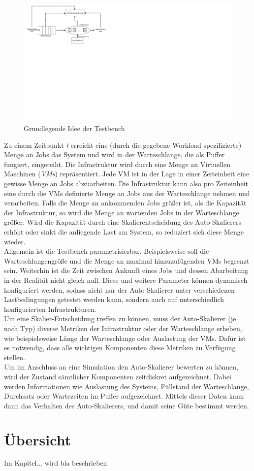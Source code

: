 \begin{figure}[!h]
	\includegraphics[width=\textwidth, trim={1cm 13cm 20cm 0cm}]{img/BasicIdea.pdf}
	\caption{Grundlegende Idee der Testbench}
	\label{fig:BasicIdea}
\end{figure}

\noindent
Zu einem Zeitpunkt \textit{t} erreicht eine (durch die gegebene Workload spezifizierte) Menge an Jobs das System und wird in der Warteschlange, die als Puffer fungiert, eingereiht. Die Infrastruktur wird durch eine Menge an Virtuellen Maschinen (\textit{VMs}) repräsentiert. Jede VM ist in der Lage in einer Zeiteinheit eine gewisse Menge an Jobs abzuarbeiten. Die Infrastruktur kann also pro Zeiteinheit eine durch die VMs definierte Menge an Jobs aus der Warteschlange nehmen und verarbeiten. Falls die Menge an ankommenden Jobs größer ist, als die Kapazität der Infrastruktur, so wird die Menge an wartenden Jobs in der Warteschlange größer. Wird die Kapazität durch eine Skalierentscheidung des Auto-Skalierers erhöht oder sinkt die anliegende Last am System, so reduziert sich diese Menge wieder. \\
Allgemein ist die Testbench parametrisierbar. Beispielsweise soll die Warteschlangengröße und die Menge an maximal hinzuzufügenden VMs begrenzt sein. Weiterhin ist die Zeit zwischen Ankunft eines Jobs und dessen Abarbeitung in der Realität nicht gleich null. Diese und weitere Parameter können dynamisch konfiguriert werden, sodass nicht nur der Auto-Skalierer unter verschiedenen Lastbedingungen getestet werden kann, sondern auch auf unterschiedlich konfigurierten Infrastrukturen. \\
Um eine Skalier-Entscheidung treffen zu können, muss der Auto-Skalierer (je nach Typ) diverse Metriken der Infrastruktur oder der Warteschlange erheben, wie beispielsweise Länge der Warteschlange oder Auslastung der VMs. Dafür ist es notwendig, dass alle wichtigen Komponenten diese Metriken zu Verfügung stellen. \\
Um im Anschluss an eine Simulation den Auto-Skalierer bewerten zu können, wird der Zustand sämtlicher Komponenten zeitdiskret aufgezeichnet. Dabei werden Informationen wie Auslastung des Systems, Füllstand der Warteschlange, Durchsatz oder Wartezeiten im Puffer aufgezeichnet. Mittels dieser Daten kann dann das Verhalten des Auto-Skalierers, und damit seine Güte bestimmt werden.

\section{Übersicht}
Im Kapitel... wird bla beschrieben


 



